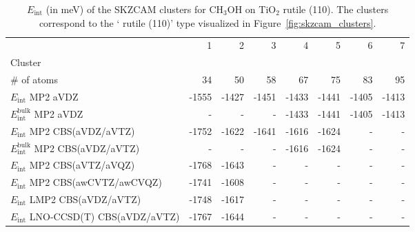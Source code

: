 \begin{table}
\caption{\label{tab:system_eint_r-tio2_ch3oh}$E_\textrm{int}$ (in meV) of the SKZCAM clusters for CH$_3$OH on TiO$_2$ rutile (110). The clusters correspond to the ` rutile (110)' type visualized in Figure~\ref{fig:skzcam_clusters}.}
\begin{adjustbox}{center,max width=1.4\textwidth}
\begin{tabular}{lrrrrrrr}
\toprule
 & 1 & 2 & 3 & 4 & 5 & 6 & 7 \\ 
Cluster &  &  &  &  &  &  &  \\
\midrule
\# of atoms & 34 & 50 & 58 & 67 & 75 & 83 & 95 \\
$E_\textrm{int}$ MP2 aVDZ & -1555 & -1427 & -1451 & -1433 & -1441 & -1405 & -1413 \\
$E_\textrm{int}^\textrm{bulk}$ MP2 aVDZ & - & - & - & -1433 & -1441 & -1405 & -1413 \\
$E_\textrm{int}$ MP2 CBS(aVDZ/aVTZ) & -1752 & -1622 & -1641 & -1616 & -1624 & - & - \\
$E_\textrm{int}^\textrm{bulk}$ MP2 CBS(aVDZ/aVTZ) & - & - & - & -1616 & -1624 & - & - \\
$E_\textrm{int}$ MP2 CBS(aVTZ/aVQZ) & -1768 & -1643 & - & - & - & - & - \\
$E_\textrm{int}$ MP2 CBS(awCVTZ/awCVQZ) & -1741 & -1608 & - & - & - & - & - \\
$E_\textrm{int}$ LMP2 CBS(aVDZ/aVTZ) & -1748 & -1617 & - & - & - & - & - \\
$E_\textrm{int}$ LNO-CCSD(T) CBS(aVDZ/aVTZ) & -1767 & -1644 & - & - & - & - & - \\
\bottomrule
\end{tabular}
\end{adjustbox}
\end{table}

